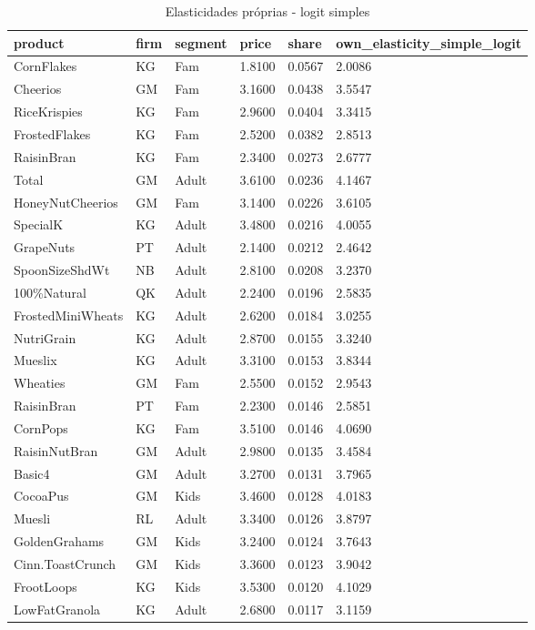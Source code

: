 \begin{table}[!htbp]
\centering
\caption{Elasticidades próprias - logit simples}
\label{tab:own-elas-simple}
\scriptsize
\begin{tabular}{llllll}
\hline
product & firm & segment & price & share & own\_elasticity\_simple\_logit
\\
\hline
CornFlakes & KG & Fam & 1.8100 & 0.0567 & 2.0086
\\
Cheerios & GM & Fam & 3.1600 & 0.0438 & 3.5547
\\
RiceKrispies & KG & Fam & 2.9600 & 0.0404 & 3.3415
\\
FrostedFlakes & KG & Fam & 2.5200 & 0.0382 & 2.8513
\\
RaisinBran & KG & Fam & 2.3400 & 0.0273 & 2.6777
\\
Total & GM & Adult & 3.6100 & 0.0236 & 4.1467
\\
HoneyNutCheerios & GM & Fam & 3.1400 & 0.0226 & 3.6105
\\
SpecialK & KG & Adult & 3.4800 & 0.0216 & 4.0055
\\
GrapeNuts & PT & Adult & 2.1400 & 0.0212 & 2.4642
\\
SpoonSizeShdWt & NB & Adult & 2.8100 & 0.0208 & 3.2370
\\
100\%Natural & QK & Adult & 2.2400 & 0.0196 & 2.5835
\\
FrostedMiniWheats & KG & Adult & 2.6200 & 0.0184 & 3.0255
\\
NutriGrain & KG & Adult & 2.8700 & 0.0155 & 3.3240
\\
Mueslix & KG & Adult & 3.3100 & 0.0153 & 3.8344
\\
Wheaties & GM & Fam & 2.5500 & 0.0152 & 2.9543
\\
RaisinBran & PT & Fam & 2.2300 & 0.0146 & 2.5851
\\
CornPops & KG & Fam & 3.5100 & 0.0146 & 4.0690
\\
RaisinNutBran & GM & Adult & 2.9800 & 0.0135 & 3.4584
\\
Basic4 & GM & Adult & 3.2700 & 0.0131 & 3.7965
\\
CocoaPus & GM & Kids & 3.4600 & 0.0128 & 4.0183
\\
Muesli & RL & Adult & 3.3400 & 0.0126 & 3.8797
\\
GoldenGrahams & GM & Kids & 3.2400 & 0.0124 & 3.7643
\\
Cinn.ToastCrunch & GM & Kids & 3.3600 & 0.0123 & 3.9042
\\
FrootLoops & KG & Kids & 3.5300 & 0.0120 & 4.1029
\\
LowFatGranola & KG & Adult & 2.6800 & 0.0117 & 3.1159

\end{tabular}
\end{table}
